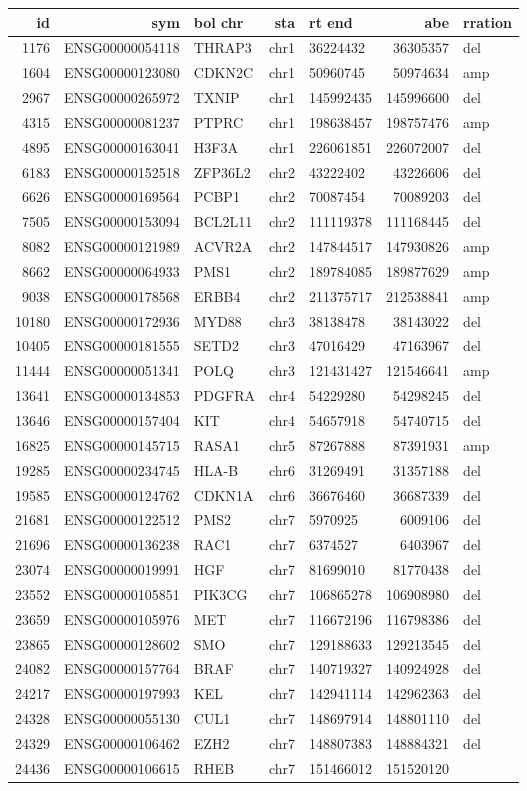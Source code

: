 \documentclass[]{article}
\begin{document}
\begin{longtable}[]{@{}rrlrlrl@{}}
\toprule
id & sym & bol chr & sta & rt end & abe & rration\tabularnewline
\midrule
\endhead
1176 & ENSG00000054118 & THRAP3 & chr1 & 36224432 & 36305357 &
del\tabularnewline
1604 & ENSG00000123080 & CDKN2C & chr1 & 50960745 & 50974634 &
amp\tabularnewline
2967 & ENSG00000265972 & TXNIP & chr1 & 145992435 & 145996600 &
del\tabularnewline
4315 & ENSG00000081237 & PTPRC & chr1 & 198638457 & 198757476 &
amp\tabularnewline
4895 & ENSG00000163041 & H3F3A & chr1 & 226061851 & 226072007 &
del\tabularnewline
6183 & ENSG00000152518 & ZFP36L2 & chr2 & 43222402 & 43226606 &
del\tabularnewline
6626 & ENSG00000169564 & PCBP1 & chr2 & 70087454 & 70089203 &
del\tabularnewline
7505 & ENSG00000153094 & BCL2L11 & chr2 & 111119378 & 111168445 &
del\tabularnewline
8082 & ENSG00000121989 & ACVR2A & chr2 & 147844517 & 147930826 &
amp\tabularnewline
8662 & ENSG00000064933 & PMS1 & chr2 & 189784085 & 189877629 &
amp\tabularnewline
9038 & ENSG00000178568 & ERBB4 & chr2 & 211375717 & 212538841 &
amp\tabularnewline
10180 & ENSG00000172936 & MYD88 & chr3 & 38138478 & 38143022 &
del\tabularnewline
10405 & ENSG00000181555 & SETD2 & chr3 & 47016429 & 47163967 &
del\tabularnewline
11444 & ENSG00000051341 & POLQ & chr3 & 121431427 & 121546641 &
amp\tabularnewline
13641 & ENSG00000134853 & PDGFRA & chr4 & 54229280 & 54298245 &
del\tabularnewline
13646 & ENSG00000157404 & KIT & chr4 & 54657918 & 54740715 &
del\tabularnewline
16825 & ENSG00000145715 & RASA1 & chr5 & 87267888 & 87391931 &
amp\tabularnewline
19285 & ENSG00000234745 & HLA-B & chr6 & 31269491 & 31357188 &
del\tabularnewline
19585 & ENSG00000124762 & CDKN1A & chr6 & 36676460 & 36687339 &
del\tabularnewline
21681 & ENSG00000122512 & PMS2 & chr7 & 5970925 & 6009106 &
del\tabularnewline
21696 & ENSG00000136238 & RAC1 & chr7 & 6374527 & 6403967 &
del\tabularnewline
23074 & ENSG00000019991 & HGF & chr7 & 81699010 & 81770438 &
del\tabularnewline
23552 & ENSG00000105851 & PIK3CG & chr7 & 106865278 & 106908980 &
del\tabularnewline
23659 & ENSG00000105976 & MET & chr7 & 116672196 & 116798386 &
del\tabularnewline
23865 & ENSG00000128602 & SMO & chr7 & 129188633 & 129213545 &
del\tabularnewline
24082 & ENSG00000157764 & BRAF & chr7 & 140719327 & 140924928 &
del\tabularnewline
24217 & ENSG00000197993 & KEL & chr7 & 142941114 & 142962363 &
del\tabularnewline
24328 & ENSG00000055130 & CUL1 & chr7 & 148697914 & 148801110 &
del\tabularnewline
24329 & ENSG00000106462 & EZH2 & chr7 & 148807383 & 148884321 &
del\tabularnewline
24436 & ENSG00000106615 & RHEB & chr7 & 151466012 & 151520120 &

\end{longtable}
\end{document}
